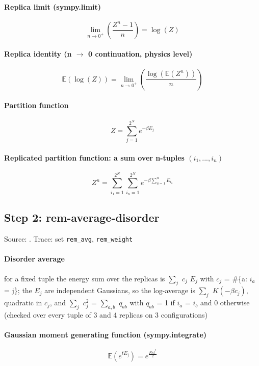 \documentclass[11pt]{article}
\begin{document}
\paragraph{Replica limit (sympy.limit)}
\begin{equation}
\lim_{n \to 0^+}\left(\frac{Z^{n} - 1}{n}\right) = \log{\left(Z \right)}
\end{equation}
\paragraph{Replica identity (n $\to$ 0 continuation, physics level)}
\begin{equation}
\mathbb{E}{\left(\log{\left(Z \right)} \right)} = \lim_{n \to 0^+}\left(\frac{\log{\left(\mathbb{E}{\left(Z^{n} \right)} \right)}}{n}\right)
\end{equation}
\paragraph{Partition function}
\begin{equation}
Z = \sum_{j=1}^{2^{N}} e^{- \beta {E}_{j}}
\end{equation}
\paragraph{Replicated partition function: a sum over n-tuples $(i_{1}, ..., i_{n})$}
\begin{equation}
Z^{n} = \sum_{{i}_{1}=1}^{2^{N}} \sum_{{i}_{n}=1}^{2^{N}} e^{- \beta \sum_{a=1}^{n} {E}_{{i}_{a}}}
\end{equation}
\subsection{Step 2: rem-average-disorder}
Source: \cite{b3,b4}. Trace: set \texttt{rem\_avg}, \texttt{rem\_weight}

\paragraph{Disorder average}
for a fixed tuple the energy sum over the replicas is $\sum _{j}$ $c_{j}$ $E_{j}$ with $c_{j}$ = \#\{a: $i_{a}$ = j\}; the $E_{j}$ are independent Gaussians, so the log-average is $\sum _{j}$ $K(-\beta  c_{j})$, quadratic in $c_{j}$, and $\sum _{j}$ $c_{j}^{2}$ = $\sum _{a,b}$ $q_{ab}$ with $q_{ab}$ = 1 if $i_{a}$ = $i_{b}$ and 0 otherwise (checked over every tuple of 3 and 4 replicas on 3 configurations)
\paragraph{Gaussian moment generating function (sympy.integrate)}
\begin{equation}
\mathbb{E}{\left(e^{t {E}_{j}} \right)} = e^{\frac{N s t^{2}}{2}}
\end{equation}
\end{document}
